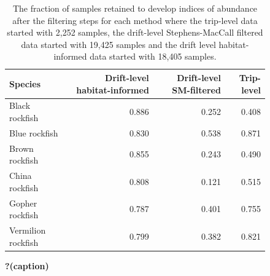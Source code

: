 \documentclass[
  12pt,
  authoryear,
  preprint,
  3p]{elsarticle}
\begin{document}
\begin{figure}

{\centering 

\hypertarget{fig-samplesize-1}{}
\begin{table}

\caption{The fraction of samples retained to develop indices
                   of abundance after the filtering steps for each method
                   where the trip-level data started with 2,252 samples, the 
                   drift-level Stephens-MacCall filtered data started with 
                   19,425 samples and the drift level habitat-informed data 
                   started with 18,405 samples.}
\centering
\begin{tabular}[t]{>{\raggedright\arraybackslash}p{1.8in}rrr}
\toprule
Species & Drift-level habitat-informed & Drift-level SM-filtered & Trip-level\\
\midrule
Black rockfish & 0.886 & 0.252 & 0.408\\
Blue rockfish & 0.830 & 0.538 & 0.871\\
Brown rockfish & 0.855 & 0.243 & 0.490\\
China rockfish & 0.808 & 0.121 & 0.515\\
Gopher rockfish & 0.787 & 0.401 & 0.755\\
\addlinespace
Vermilion rockfish & 0.799 & 0.382 & 0.821\\
\bottomrule
\end{tabular}
\end{table}

}

\caption{\label{fig-samplesize}\textbf{?(caption)}}

\end{figure}
\end{document}
